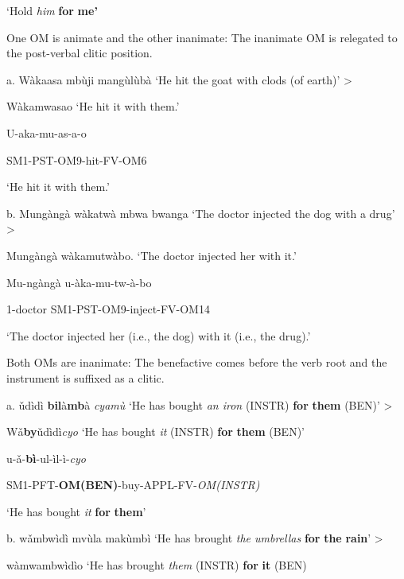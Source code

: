 \documentclass[output=paper]{langscibook}
\begin{document}
\glt ‘Hold \textit{him} \textbf{for} \textbf{me’}

\ea%
    \label{ex:lukusa:34}
    \z

          One OM is animate and the other inanimate: The inanimate OM is relegated to the post-verbal clitic position.

a.  Wàkaasa mbùji mangùlùbà    ‘He hit the goat with clods (of earth)’   >


Wàkamwasao              ‘He hit it with them.’  



U-aka-mu-as-a-o



SM1-PST-OM9-hit-FV-OM6



\glt ‘He hit it with them.’


b.   Mungàngà wàkatwà mbwa bwanga  ‘The doctor injected the dog with a drug’ >


Mungàngà wàkamutwàb{o}.        ‘The doctor injected her with it.’



Mu-ngàngà    u-àka-mu-tw-à{}-bo



1-doctor      SM1-PST-OM9-inject-FV-OM14



\glt ‘The doctor injected her (i.e., the dog) with it (i.e., the drug).’


\ea%
    \label{ex:lukusa:35}
    \z

           Both OMs are inanimate: The benefactive comes before the verb root and the instrument is suffixed as a clitic.

a.  {ǔ}d{ì}d{ì} \textbf{bil}à\textbf{mb}à \textit{cyamù}    ‘He has bought \textit{an iron} (INSTR) \textbf{for} \textbf{them} (BEN)’ >

W{ǎ}\textbf{by}{ǔ}d{ì}d{ì}\textit{cyo}          ‘He has bought \textit{it} (INSTR) \textbf{for} \textbf{them} (BEN)’

{u}{}-{ǎ}{}-\textbf{b}{\textbf{ì}}{}-ul-{ì}l-{ì}{}-\textit{cyo}

SM1-PFT-\textbf{OM(BEN)}{}-buy-APPL-FV-\textit{OM(INSTR)}

\glt ‘He has bought \textit{it} \textbf{for} \textbf{them}’

b.  w{ǎ}mbw{ì}d{ì} mvùla makùmb{ì}  ‘He has brought \textit{the umbrellas} \textbf{for} \textbf{the} \textbf{rain}’ >

wà{mwa}mbw{ì}d{ì}o          ‘He has brought \textit{them} (INSTR) \textbf{for} \textbf{it} (BEN)
\end{document}
